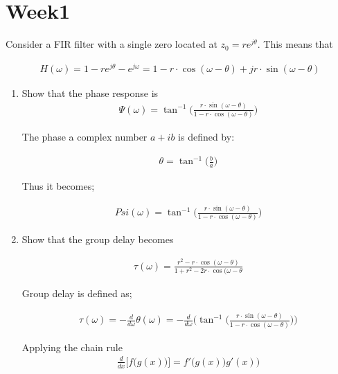 \thispagestyle{fancy}
\section{Week1}

Consider a FIR filter with a single zero located at $z_0 = re^{j\theta}$. This means that

\begin{align}
   H(\omega) = 1-re^{j\theta}-e^{j\omega} = 1- r \cdot \cos(\omega -\theta) + jr \cdot \sin(\omega - \theta)
\end{align}


\begin{enumerate}
\tightlist
\item Show that the phase response is
  \begin{align}
    \Psi(\omega) = \tan^{-1} \bigg(\frac{r\cdot \sin(\omega-\theta)}{1-r\cdot\cos(\omega-\theta)}\bigg)
  \end{align}

The phase a complex number $a+ib$ is defined by:

\begin{align}
    \theta=\tan^{-1}\bigg(\frac{b}{a}\bigg)
\end{align}

Thus it becomes;

\begin{align}
    Psi(\omega)=\tan^{-1} \bigg(\frac{r\cdot \sin(\omega-\theta)}{1-r\cdot\cos(\omega-\theta)}\bigg)
\end{align}

    \item Show that the group delay becomes
    
    \begin{align}
        \tau(\omega)=\frac{r^2-r\cdot \cos(\omega-\theta)}{1+r^2-2r\cdot \cos(\omega-\theta}
    \end{align}
    
    Group delay is defined as;
    
    \begin{align}
        \tau(\omega)=-\frac{d}{d\omega}\theta(\omega)=-\frac{d}{d\omega}\Bigg(\tan^{-1} \bigg(\frac{r\cdot \sin(\omega-\theta)}{1-r\cdot\cos(\omega-\theta)}\bigg)\Bigg)
    \end{align}
    
    Applying the chain rule
    \begin{align}
        \frac{d}{dx}\big[f\big(g(x)\big)\big]= f'\big(g(x))g'(x)\big)
    \end{align}
    

\end{enumerate}
